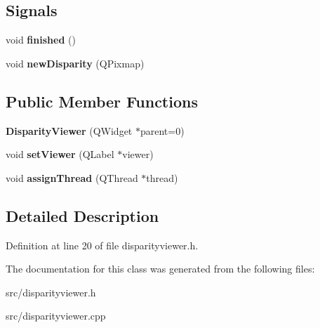 \subsection*{Signals}
\begin{DoxyCompactItemize}
\item 
\hypertarget{class_disparity_viewer_ac1f50ec04e6fcaa0b8a7cbb214f9c148}{}void {\bfseries finished} ()\label{class_disparity_viewer_ac1f50ec04e6fcaa0b8a7cbb214f9c148}

\item 
\hypertarget{class_disparity_viewer_afd82a842f154a3ae24090048476f49eb}{}void {\bfseries new\+Disparity} (Q\+Pixmap)\label{class_disparity_viewer_afd82a842f154a3ae24090048476f49eb}

\end{DoxyCompactItemize}
\subsection*{Public Member Functions}
\begin{DoxyCompactItemize}
\item 
\hypertarget{class_disparity_viewer_ad373b498801c6bdc3e2d6835a60e8611}{}{\bfseries Disparity\+Viewer} (Q\+Widget $\ast$parent=0)\label{class_disparity_viewer_ad373b498801c6bdc3e2d6835a60e8611}

\item 
\hypertarget{class_disparity_viewer_a7224a0cc574ec3b7255edc35ee80094b}{}void {\bfseries set\+Viewer} (Q\+Label $\ast$viewer)\label{class_disparity_viewer_a7224a0cc574ec3b7255edc35ee80094b}

\item 
\hypertarget{class_disparity_viewer_a67aec5bc6a1c7160f997b29f1e486d40}{}void {\bfseries assign\+Thread} (Q\+Thread $\ast$thread)\label{class_disparity_viewer_a67aec5bc6a1c7160f997b29f1e486d40}

\end{DoxyCompactItemize}


\subsection{Detailed Description}


Definition at line 20 of file disparityviewer.\+h.



The documentation for this class was generated from the following files\+:\begin{DoxyCompactItemize}
\item 
src/disparityviewer.\+h\item 
src/disparityviewer.\+cpp\end{DoxyCompactItemize}
